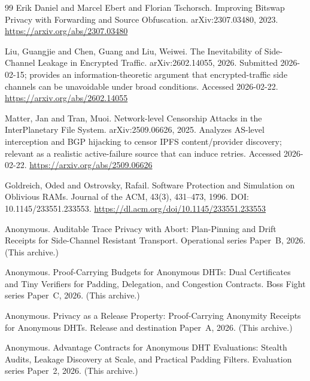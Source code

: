 \documentclass[11pt]{article}
\begin{document}
\begin{thebibliography}{99}
Erik Daniel and Marcel Ebert and Florian Tschorsch.
\newblock Improving {Bitswap} Privacy with Forwarding and Source Obfuscation.
\newblock arXiv:2307.03480, 2023.
\newblock \url{https://arxiv.org/abs/2307.03480}

Liu, Guangjie and Chen, Guang and Liu, Weiwei.
\newblock The Inevitability of Side-Channel Leakage in Encrypted Traffic.
\newblock arXiv:2602.14055, 2026.
\newblock Submitted 2026-02-15; provides an information-theoretic argument that encrypted-traffic side channels can be unavoidable under broad conditions. Accessed 2026-02-22.
\newblock \url{https://arxiv.org/abs/2602.14055}

Matter, Jan and Tran, Muoi.
\newblock Network-level Censorship Attacks in the InterPlanetary File System.
\newblock arXiv:2509.06626, 2025.
\newblock Analyzes AS-level interception and BGP hijacking to censor IPFS content/provider discovery; relevant as a realistic active-failure source that can induce retries. Accessed 2026-02-22.
\newblock \url{https://arxiv.org/abs/2509.06626}

Goldreich, Oded and Ostrovsky, Rafail.
\newblock Software Protection and Simulation on Oblivious {RAM}s.
\newblock Journal of the {ACM}, 43(3), 431--473, 1996.
\newblock DOI: 10.1145/233551.233553.
\newblock \url{https://dl.acm.org/doi/10.1145/233551.233553}

Anonymous.
\newblock Auditable Trace Privacy with Abort: Plan-Pinning and Drift Receipts for Side-Channel Resistant Transport.
\newblock Operational series Paper~B, 2026. (This archive.)

Anonymous.
\newblock Proof-Carrying Budgets for Anonymous DHTs: Dual Certificates and Tiny Verifiers for Padding, Delegation, and Congestion Contracts.
\newblock Boss Fight series Paper~C, 2026. (This archive.)

Anonymous.
\newblock Privacy as a Release Property: Proof-Carrying Anonymity Receipts for Anonymous DHTs.
\newblock Release and destination Paper~A, 2026. (This archive.)

Anonymous.
\newblock Advantage Contracts for Anonymous DHT Evaluations: Stealth Audits, Leakage Discovery at Scale, and Practical Padding Filters.
\newblock Evaluation series Paper~2, 2026. (This archive.)


\end{thebibliography}
\end{document}
